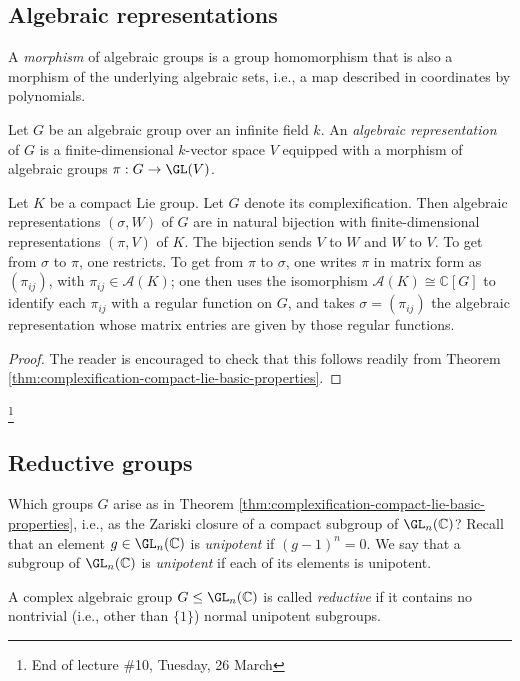 \documentclass[reqno]{amsart} 
\begin{document}
\subsection{Algebraic representations}
\begin{definition}
  A \emph{morphism} of algebraic groups is a group homomorphism that is also a morphism of the underlying algebraic sets, i.e., a map described in coordinates by polynomials.
  
  Let $G$ be an algebraic group over an infinite field $k$.  An \emph{algebraic representation} of $G$ is a finite-dimensional $k$-vector space $V$ equipped with a morphism of algebraic groups $\pi : G \rightarrow \GL(V)$.
\end{definition}

\begin{theorem}\label{thm:alg-rep}
  Let $K$ be a compact Lie group.  Let $G$ denote its complexification.  Then algebraic representations $(\sigma,W)$ of $G$ are in natural bijection with finite-dimensional representations $(\pi,V)$ of $K$.  The bijection sends $V$ to $W$ and $W$ to $V$.  To get from $\sigma$ to $\pi$, one restricts.  To get from $\pi$ to $\sigma$, one writes $\pi$ in matrix form as $(\pi_{i j})$, with $\pi_{i j} \in \mathcal{A}(K)$; one then uses the isomorphism $\mathcal{A}(K) \cong \mathbb{C}[G]$ to identify each $\pi_{i j}$ with a regular function on $G$, and takes $\sigma = (\pi_{i j})$ the algebraic representation whose matrix entries are given by those regular functions.
\end{theorem}
\begin{proof}
  The reader is encouraged to check that this follows readily from Theorem \ref{thm:complexification-compact-lie-basic-properties}.
\end{proof}

\footnote{End of lecture \#10, Tuesday, 26 March}

\subsection{Reductive groups}
Which groups $G$ arise as in Theorem \ref{thm:complexification-compact-lie-basic-properties}, i.e., as the Zariski closure of a compact subgroup of $\GL_n(\mathbb{C})$?  Recall that an element $g \in \GL_n(\mathbb{C})$ is \emph{unipotent} if $(g - 1)^n = 0$.  We say that a subgroup of $\GL_n(\mathbb{C})$ is \emph{unipotent} if each of its elements is unipotent.

\begin{definition}
  A complex algebraic group $G \leq \GL_n(\mathbb{C})$ is called \emph{reductive} if it contains no nontrivial (i.e., other than $\{1\}$) normal unipotent subgroups.
\end{definition}
\end{document}
